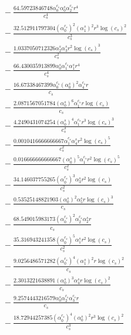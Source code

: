\documentclass[10pt]{article}
\begin{document}
\begin{align*}
&{}  - \frac{64.59723846748 \alpha_{0}^{c_s} \alpha_{0}^s \alpha_{2}^{c_s} r^{4}}{c_{s}^{4}} \\
&{}  - \frac{32.512911797304 \left(\alpha_{0}^{c_s}\right)^{2} \left(\alpha_{1}^s\right)^{2} r^{3} \log{\left(c_{s} \right)}^{2}}{c_{s}^{3}} \\
&{}  - \frac{1.0337050712326 \alpha_{2}^s \alpha_{3}^s r^{2} \log{\left(c_{s} \right)}^{3}}{c_{s}^{2}} \\
&{}  - \frac{66.430035913899 \alpha_{0}^s \alpha_{1}^{c_s} \alpha_{1}^s r^{4}}{c_{s}^{4}} \\
&{}  - \frac{16.67338467399 \alpha_{0}^{c_s} \left(\alpha_{0}^s\right)^{2} \alpha_{4}^{c_s} r}{c_{s}} \\
&{}  - \frac{2.0871567051784 \left(\alpha_{0}^s\right)^{6} \alpha_{1}^{c_s} r \log{\left(c_{s} \right)}}{c_{s}} \\
&{}  - \frac{4.2490431074254 \left(\alpha_{0}^s\right)^{4} \alpha_{1}^{c_s} r^{3} \log{\left(c_{s} \right)}^{3}}{c_{s}^{3}} \\
&{}  - \frac{0.0010416666666667 \alpha_{1}^{c_s} \alpha_{4}^s r^{2} \log{\left(c_{s} \right)}^{5}}{c_{s}^{2}} \\
&{}  - \frac{0.016666666666667 \left(\alpha_{0}^s\right)^{5} \alpha_{1}^{c_s} r^{2} \log{\left(c_{s} \right)}^{5}}{c_{s}^{2}} \\
&{}  - \frac{34.146037755265 \left(\alpha_{0}^{c_s}\right)^{3} \alpha_{3}^s r^{2} \log{\left(c_{s} \right)}}{c_{s}^{2}} \\
&{}  - \frac{0.53525148821903 \left(\alpha_{0}^s\right)^{2} \alpha_{5}^s r \log{\left(c_{s} \right)}^{3}}{c_{s}} \\
&{}  - \frac{68.549015983173 \left(\alpha_{0}^{c_s}\right)^{2} \alpha_{2}^{c_s} \alpha_{2}^s r}{c_{s}} \\
&{}  - \frac{35.316943241358 \left(\alpha_{0}^{c_s}\right)^{5} \alpha_{1}^s r^{2} \log{\left(c_{s} \right)}}{c_{s}^{2}} \\
&{}  - \frac{9.0256486571282 \left(\alpha_{0}^{c_s}\right)^{4} \left(\alpha_{1}^s\right)^{2} r \log{\left(c_{s} \right)}^{2}}{c_{s}} \\
&{}  - \frac{2.3013221638891 \left(\alpha_{0}^s\right)^{3} \alpha_{4}^s r \log{\left(c_{s} \right)}^{2}}{c_{s}} \\
&{}  - \frac{9.2574443216579 \alpha_{0}^s \alpha_{2}^{c_s} \alpha_{3}^{c_s} r}{c_{s}} \\
&{}  - \frac{18.72944257385 \left(\alpha_{0}^{c_s}\right)^{4} \left(\alpha_{0}^s\right)^{2} r^{3} \log{\left(c_{s} \right)}^{2}}{c_{s}^{3}} \\

\end{align*}
\end{document}

